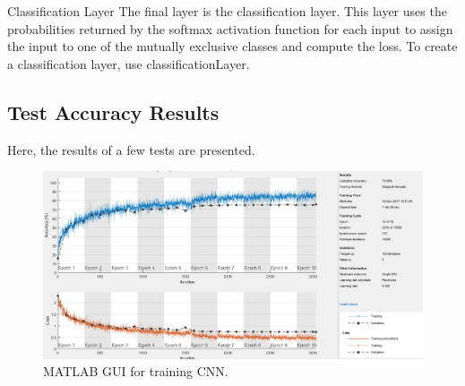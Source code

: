 Classification Layer The final layer is the classification layer. This layer uses the probabilities returned by the softmax activation function for each input to assign the input to one of the mutually exclusive classes and compute the loss. To create a classification layer, use classificationLayer.

\subsection{Test Accuracy Results}

Here, the results of a few tests are presented.

\begin{figure}[h!]
	\centering
	\includegraphics[width=\textwidth]{images/CNNTrain}
	\caption{MATLAB GUI for training CNN.}
	\label{fig:CNNTrain}
\end{figure}



    
